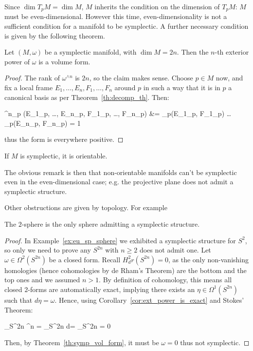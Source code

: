 \documentclass[main.tex]{subfiles}
\begin{document}
Since $\dim T_pM = \dim M$, $M$ inherits the condition on the dimension of $T_pM$: $M$ must be even-dimensional. However this time, even-dimensionality is not a sufficient condition for a manifold to be symplectic. A further necessary condition is given by the following theorem.

\begin{theorem}
\label{th:symp_vol_form}
	Let $(M, \omega)$ be a symplectic manifold, with $\dim M = 2n$. Then the $n$-th exterior power of $\omega$ is a volume form.
\end{theorem}
\begin{proof}
	The rank of $\omega^{\wedge n}$ is $2n$, so the claim makes sense. Choose $p \in M$ now, and fix a local frame $E_1, \ldots, E_n, F_1, \ldots, F_n$ around $p$ in such a way that  it is in $p$ a canonical basis as per Theorem~\ref{th:decomp_th}. Then:
	\begin{eqalign}
		\omega^{\wedge n}_p (E_1\vert_p, \ldots, E_n\vert_p, F_1\vert_p, \ldots, F_n\vert_p) &= \omega_p(E_1\vert_p, F_1\vert_p) \cdot \ldots \cdot \omega_p(E_n\vert_p, F_n\vert_p) = 1
	\end{eqalign}
	thus the form is everywhere positive.
\end{proof}
\begin{corollary}
	If $M$ is symplectic, it is orientable.
\end{corollary}

The obvious remark is then that non-orientable manifolds can't be symplectic even in the even-dimensional case; e.g. the projective plane does not admit a symplectic structure.

Other obstructions are given by topology. For example

\begin{theorem}
	The $2$-sphere is the only sphere admitting a symplectic structure.
\end{theorem}
\begin{proof}
	In Example~\ref{ex:eu_sp_sphere} we exhibited a symplectic structure for $S^2$, so only we need to prove any $S^{2n}$ with $n \geq 2$ does not admit one. Let $\omega \in \Omega^2(S^{2n})$ be a closed form. Recall $H^2_dr(S^{2n}) = 0$, as the only non-vanishing homologies (hence cohomologies by de Rham's Theorem) are the bottom and the top ones and we assumed $n > 1$. By definition of cohomology, this means all closed $2$-forms are automatically exact, implying there exists an $\eta \in \Omega^1(S^{2n})$ such that $d\eta = \omega$. Hence, using Corollary~\ref{cor:ext_power_is_exact} and Stokes' Theorem:
	\begin{eqalign}
		\int_{S^{2n}} \omega^{\wedge n} = \int_{S^{2n}} d\eta = \int_{\partial S^{2n}} \eta = 0
	\end{eqalign}
	Then, by Theorem~\ref{th:symp_vol_form}, it must be $\omega = 0$ thus not symplectic.
\end{proof}
\end{document}
